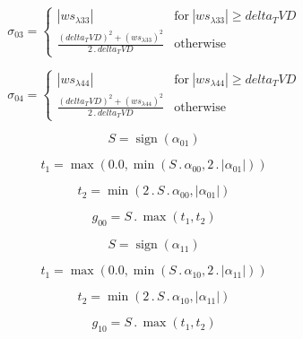 \documentclass{article}
\begin{document}
\begin{dmath}\sigma_{0 3} = \begin{cases} \left|{ws_{\lambda 33}}\right| & \text{for}\: \left|{ws_{\lambda 33}}\right| \geq delta_TVD \\\frac{\left(delta_TVD \right)^{2} + \left(ws_{\lambda 33} \right)^{2}}{2 \,.\, delta_TVD} & \text{otherwise} 
\end{cases}\end{dmath}

\begin{dmath}\sigma_{0 4} = \begin{cases} \left|{ws_{\lambda 44}}\right| & \text{for}\: \left|{ws_{\lambda 44}}\right| \geq delta_TVD \\\frac{\left(delta_TVD \right)^{2} + \left(ws_{\lambda 44} \right)^{2}}{2 \,.\, delta_TVD} & \text{otherwise} 
\end{cases}\end{dmath}

\begin{dmath}S = \operatorname{sign}{\left (\alpha_{01} \right )}\end{dmath}

\begin{dmath}t_{1} = \max\left(0.0, \min\left(S \,.\, \alpha_{00}, 2 \,.\, \left|{\alpha_{01}}\right|\right)\right)\end{dmath}

\begin{dmath}t_{2} = \min\left(2 \,.\, S \,.\, \alpha_{00}, \left|{\alpha_{01}}\right|\right)\end{dmath}

\begin{dmath}g_{00} = S \,.\, \max\left(t_{1}, t_{2}\right)\end{dmath}

\begin{dmath}S = \operatorname{sign}{\left (\alpha_{11} \right )}\end{dmath}

\begin{dmath}t_{1} = \max\left(0.0, \min\left(S \,.\, \alpha_{10}, 2 \,.\, \left|{\alpha_{11}}\right|\right)\right)\end{dmath}

\begin{dmath}t_{2} = \min\left(2 \,.\, S \,.\, \alpha_{10}, \left|{\alpha_{11}}\right|\right)\end{dmath}

\begin{dmath}g_{10} = S \,.\, \max\left(t_{1}, t_{2}\right)\end{dmath}
\end{document}
